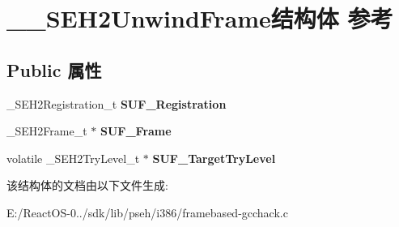 \hypertarget{struct_____s_e_h2_unwind_frame}{}\section{\+\_\+\+\_\+\+S\+E\+H2\+Unwind\+Frame结构体 参考}
\label{struct_____s_e_h2_unwind_frame}
\subsection*{Public 属性}
\begin{DoxyCompactItemize}
\item 
\mbox{\label{struct_____s_e_h2_unwind_frame_ae7a566f309ede708f9acb3e9b56cd011}} 
\+\_\+\+S\+E\+H2\+Registration\+\_\+t {\bfseries S\+U\+F\+\_\+\+Registration}
\item 
\mbox{\label{struct_____s_e_h2_unwind_frame_ac050c7b46134ddb28396014727126bdb}} 
\+\_\+\+S\+E\+H2\+Frame\+\_\+t $\ast$ {\bfseries S\+U\+F\+\_\+\+Frame}
\item 
\mbox{\label{struct_____s_e_h2_unwind_frame_a2fccd06b2b91418675a610bd580871ea}} 
volatile \+\_\+\+S\+E\+H2\+Try\+Level\+\_\+t $\ast$ {\bfseries S\+U\+F\+\_\+\+Target\+Try\+Level}
\end{DoxyCompactItemize}


该结构体的文档由以下文件生成\+:\begin{DoxyCompactItemize}
\item 
E\+:/\+React\+O\+S-\/0../sdk/lib/pseh/i386/framebased-\/gcchack.\+c\end{DoxyCompactItemize}
